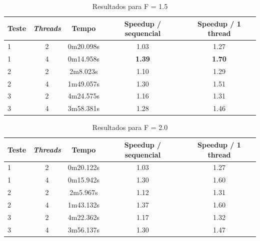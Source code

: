 \documentclass[12pt]{article}
\begin{document}
\begin{table}[H]
   \begin{center}
    \begin{tabular}{ | l | c | c | c | c |}
      \hline
      \textbf{Teste} & \textbf{\textit{Threads}} & \textbf{Tempo} & \textbf{Speedup / sequencial} & \textbf{Speedup / 1 thread}\\ \hline
      1 & 2 & 0m20.098s & 1.03 & 1.27 \\ \hline
      1 & 4 & 0m14.958s & \textbf{1.39} & \textbf{1.70} \\ \hline
      2 & 2 & 2m8.023s & 1.10 & 1.29 \\ \hline
      2 & 4 & 1m49.057s & 1.30 & 1.51 \\ \hline
      3 & 2 & 4m24.575s & 1.16 & 1.31 \\ \hline
      3 & 4 & 3m58.381s & 1.28 & 1.46 \\ \hline
  \end{tabular}
  \caption{Resultados para F = 1.5}
  \label{tbl:resultados15}
  \end{center}
\end{table}

\begin{table}[H]
  \begin{center}
    \begin{tabular}{ | l | c | c | c | c |}
      \hline
      \textbf{Teste} & \textbf{\textit{Threads}} & \textbf{Tempo} & \textbf{Speedup / sequencial} & \textbf{Speedup / 1 thread}\\ \hline
      1 & 2 & 0m20.122s & 1.03 & 1.27 \\ \hline
      1 & 4 & 0m15.942s & 1.30 & 1.60 \\ \hline
      2 & 2 & 2m5.967s & 1.12 & 1.31 \\ \hline
      2 & 4 & 1m43.132s & 1.37 & 1.60 \\ \hline
      3 & 2 & 4m22.362s & 1.17 & 1.32 \\ \hline
      3 & 4 & 3m56.137s & 1.30 & 1.47 \\ \hline
  \end{tabular}
  \caption{Resultados para F = 2.0}
  \label{tbl:resultados2}
  \end{center}
\end{table}
\end{document}
